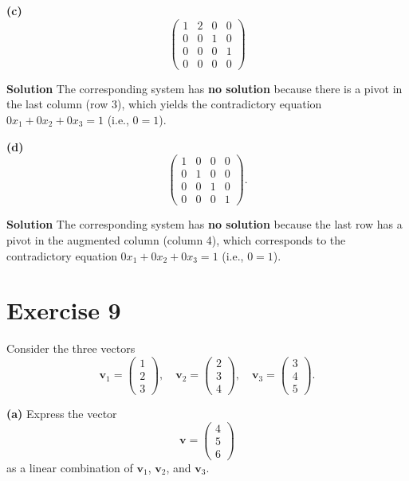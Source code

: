 \documentclass[12pt,a4paper]{article}
\begin{document}
\Needspace{7cm}
\textbf{(c)}
\[
\begin{pmatrix}
	1 & 2 & 0 & 0\\
	0 & 0 & 1 & 0\\
	0 & 0 & 0 & 1\\
	0 & 0 & 0 & 0
\end{pmatrix}
\]

\textbf{Solution}
The corresponding system has \textbf{no solution} because there is a pivot in the last column (row 3), which yields the contradictory equation $0x_1 + 0x_2 + 0x_3 = 1$ (i.e., $0 = 1$).
\par\nopagebreak\vspace{1cm}

\Needspace{7cm}
\textbf{(d)}
\[
\begin{pmatrix}
	1 & 0 & 0 & 0\\
	0 & 1 & 0 & 0\\
	0 & 0 & 1 & 0\\
	0 & 0 & 0 & 1
\end{pmatrix}.
\]

\textbf{Solution}
The corresponding system has \textbf{no solution} because the last row has a pivot in the augmented column (column 4), which corresponds to the contradictory equation $0x_1 + 0x_2 + 0x_3 = 1$ (i.e., $0 = 1$).
\par\nopagebreak
\section*{Exercise 9}
Consider the three vectors
\[
\mathbf{v}_1=\begin{pmatrix}1\\2\\3\end{pmatrix},\quad
\mathbf{v}_2=\begin{pmatrix}2\\3\\4\end{pmatrix},\quad
\mathbf{v}_3=\begin{pmatrix}3\\4\\5\end{pmatrix}.
\]

\textbf{(a)} Express the vector
\[
\mathbf{v}=\begin{pmatrix}4\\5\\6\end{pmatrix}
\]
as a linear combination of $\mathbf{v}_1$, $\mathbf{v}_2$, and $\mathbf{v}_3$.
\end{document}
